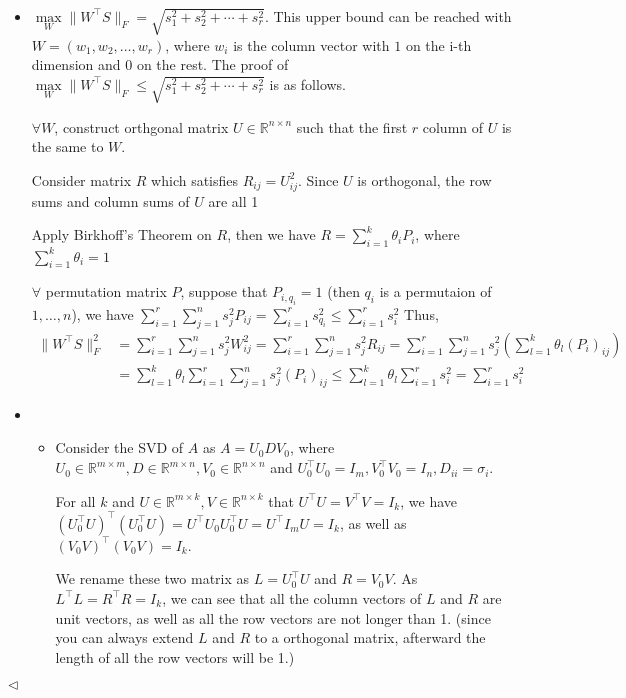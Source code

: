 \documentclass[11pt]{article}
\newenvironment{answer}[1][Answer]{\begin{trivlist}
\item[\hskip \labelsep {\bfseries #1.}\hskip \labelsep]}{\hfill$\lhd$\end{trivlist}}
\begin{document}
\begin{answer}
\\
\begin{itemize}

    \item [(1)]
    $\underset{W}{\max}\|W^\top S\|_F = \sqrt{s_1^2+s_2^2+\cdots+s_r^2}$. This upper bound can be reached with $W=(w_1,w_2,\dots,w_r)$, where $w_i$ is the column vector with $1$ on the i-th dimension and $0$ on the rest. The proof of $\underset{W}{\max}\|W^\top S\|_F \leq \sqrt{s_1^2+s_2^2+\cdots+s_r^2}$ is as follows.
    
$\forall W$, construct orthgonal matrix $U\in \mathbb R^{n\times n}$ such that the first $r$ column of $U$ is the same to $W$.

Consider matrix $R$ which satisfies $R_{ij}=U_{ij}^2$. Since $U$ is orthogonal, the row sums and column sums of $U$ are all 1

Apply Birkhoff's Theorem on $R$, then we have $R=\sum_{i=1}^k\theta_iP_i$, where $\sum_{i=1}^k \theta_i=1$

$\forall$ permutation matrix $P$, suppose that $P_{i,q_i}=1$ (then $q_i$ is a permutaion of $1,\dots,n$), we have $\sum_{i=1}^r\sum_{j=1}^ns_j^2P_{ij}=\sum_{i=1}^rs_{q_i}^2\leq \sum_{i=1}^r s_i^2$
Thus,
$$\begin{align*}\|W^\top S\|_F^2&=\sum_{i=1}^r\sum_{j=1}^ns_j^2W_{ij}^2=\sum_{i=1}^r\sum_{j=1}^ns_j^2R_{ij}=\sum_{i=1}^r\sum_{j=1}^ns_j^2(\sum_{l=1}^k\theta_l(P_i)_{ij})\\&=\sum_{l=1}^k \theta_l\sum_{i=1}^r\sum_{j=1}^ns_j^2(P_i)_{ij}\leq \sum_{l=1}^k\theta_l\sum_{i=1}^rs_i^2=\sum_{i=1}^rs_i^2\end{align*}$$
\item [(2)]
    \begin{itemize}

        \item [(a)]
        Consider the SVD of $A$ as $A=U_0 D V_0$, where $U_0 \in \mathbb{R}^{m \times m}, D \in \mathbb{R}^{m \times n}, V_0 \in \mathbb{R}^{n \times n}$ and $U_0^{\top} U_0=I_m, V_0^{\top} V_0=I_n, D_{i i}=\sigma_i$.

For all $k$ and $U \in \mathbb{R}^{m \times k}, V \in \mathbb{R}^{n \times k}$ that $U^{\top} U=V^{\top} V=I_k$, we have $\left(U_0^{\top} U\right)^{\top}\left(U_0^{\top} U\right)=U^{\top} U_0 U_0^{\top} U=U^{\top} I_m U=I_k$, as well as $\left(V_0 V\right)^{\top}\left(V_0 V\right)=I_k$.

We rename these two matrix as $L=U_0^{\top} U$ and $R=V_0 V$. As $L^{\top} L=R^{\top} R=I_k$, we can see that all the column vectors of $L$ and $R$ are unit vectors, as well as all the row vectors are not longer than 1. (since you can always extend $L$ and $R$ to a orthogonal matrix, afterward the length of all the row vectors will be 1.)


\end{itemize}
\end{itemize}
\end{answer}
\end{document}
